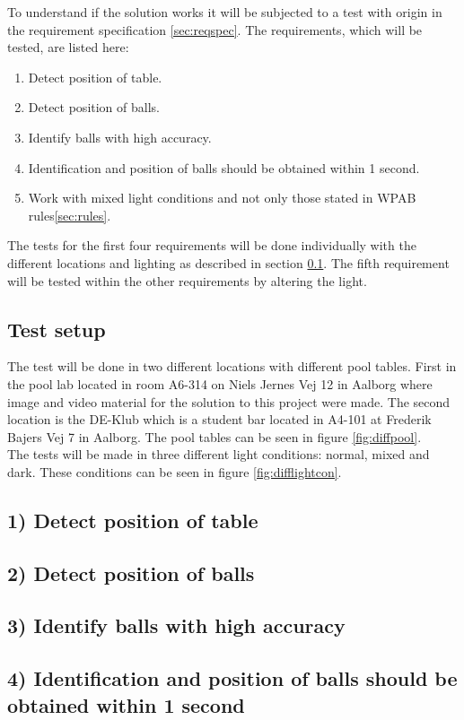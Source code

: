 To understand if the solution works it will be subjected to a test with origin in the requirement specification \ref{sec:reqspec}. The requirements, which will be tested, are listed here:

\begin{enumerate}
	\item Detect position of table.
	\item Detect position of balls.
	\item Identify balls with high accuracy.
	\item Identification and position of balls should be obtained within 1 second.
	\item Work with mixed light conditions and not only those stated in WPAB rules\ref{sec:rules}.
\end{enumerate}

The tests for the first four requirements will be done individually with the different locations and lighting as described in section \ref{sec:testsetup}. The fifth requirement will be tested within the other requirements by altering the light.

\subsection{Test setup}
\label{sec:testsetup}
The test will be done in two different locations with different pool tables. First in the pool lab located in room A6-314 on Niels Jernes Vej 12 in Aalborg where image and video material for the solution to this project were made. The second location is the DE-Klub which is a student bar located in A4-101 at Frederik Bajers Vej 7 in Aalborg. The pool tables can be seen in figure \ref{fig:diffpool}.\\

The tests will be made in three different light conditions: normal, mixed and dark. These conditions can be seen in figure \ref{fig:difflightcon}.\\


\subsection{1) Detect position of table}
\subsection{2) Detect position of balls}
\subsection{3) Identify balls with high accuracy}
\subsection{4) Identification and position of balls should be obtained within 1 second}


